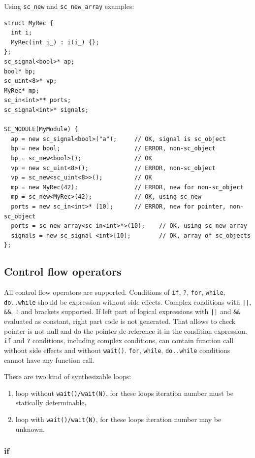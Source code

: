 Using {\tt sc\_new} and {\tt sc\_new\_array} examples:
% 
\begin{lstlisting}[style=mycpp]
struct MyRec {
  int i;
  MyRec(int i_) : i(i_) {};
};
sc_signal<bool>* ap;
bool* bp;
sc_uint<8>* vp;
MyRec* mp;
sc_in<int>** ports;
sc_signal<int>* signals;
   
SC_MODULE(MyModule) {
  ap = new sc_signal<bool>("a");     // OK, signal is sc_object
  bp = new bool;                     // ERROR, non-sc_object
  bp = sc_new<bool>();               // OK
  vp = new sc_uint<8>();             // ERROR, non-sc_object
  vp = sc_new<sc_uint<8>>();         // OK
  mp = new MyRec(42);                // ERROR, new for non-sc_object
  mp = sc_new<MyRec>(42);            // OK, using sc_new
  ports = new sc_in<int>* [10];      // ERROR, new for pointer, non-sc_object 
  ports = sc_new_array<sc_in<int>*>(10);    // OK, using sc_new_array
  signals = new sc_signal <int>[10];        // OK, array of sc_objects 
};
\end{lstlisting}


\subsection{Control flow operators}

All control flow operators are supported. 
Conditions of {\tt if}, {\tt ?}, {\tt for}, {\tt while}, {\tt do..while} should be expression without side effects. Complex conditions with {\tt ||}, {\tt \&\&}, {\tt !} and brackets supported. If left part of logical expressions with {\tt ||} and {\tt \&\&} evaluated as constant, right part code is not generated. 
%
That allows to check pointer is not null and do the pointer de-reference it in the condition expression. {\tt if} and {\tt ?} conditions, including complex conditions, can contain function call without side effects and without {\tt wait()}. {\tt for}, {\tt while}, {\tt do..while} conditions cannot have any function call.

There are two kind of synthesizable loops:
\begin{enumerate}
\item loop without {\tt wait()/wait(N)}, for these loops iteration number must be statically determinable,
\item loop with {\tt wait()/wait(N)}, for these loops iteration number may be unknown.
\end{enumerate}


\subsubsection{if}

